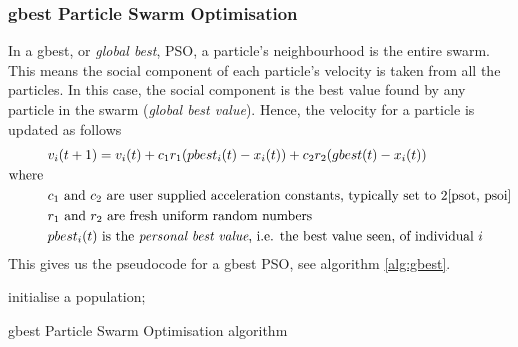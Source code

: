 \subsubsection{gbest Particle Swarm Optimisation}
In a gbest, or \emph{global best}, PSO, a particle's neighbourhood is the entire swarm. This means the social component of each particle's velocity is taken from all the particles. In this case, the social component is the best value found by any particle in the swarm (\emph{global best value}). Hence, the velocity for a particle is updated as follows\cite{4-pso, psot} \begin{equation}
  \begin{split}
    &v_{i}(t+1) = v_{i}(t) + c_{1}r_{1}(pbest_{i}(t) - x_{i}(t)) + c_{2}r_{2}(gbest(t) - x_{i}(t)) \\
    \text{where } \\
    &c_{1}\text{ and }c_{2} \text{ are user supplied acceleration constants, typically set to 2\cite{psot, psoi}} \\
    &r_{1}\text{ and }r_{2}\text{ are fresh uniform random numbers} \\
    &pbest_{i}(t)\text{ is the \emph{personal best value}, i.e. the best value seen, of individual }i
  \end{split}
\label{eq:gvel}
\end{equation}
This gives us the pseudocode for a gbest PSO, see algorithm \ref{alg:gbest}.
\begin{algorithm}[tp]
\label{alg:gbest}
  \SetAlgoLined
  initialise a population; \\
\caption{gbest Particle Swarm Optimisation algorithm}
\end{algorithm}

